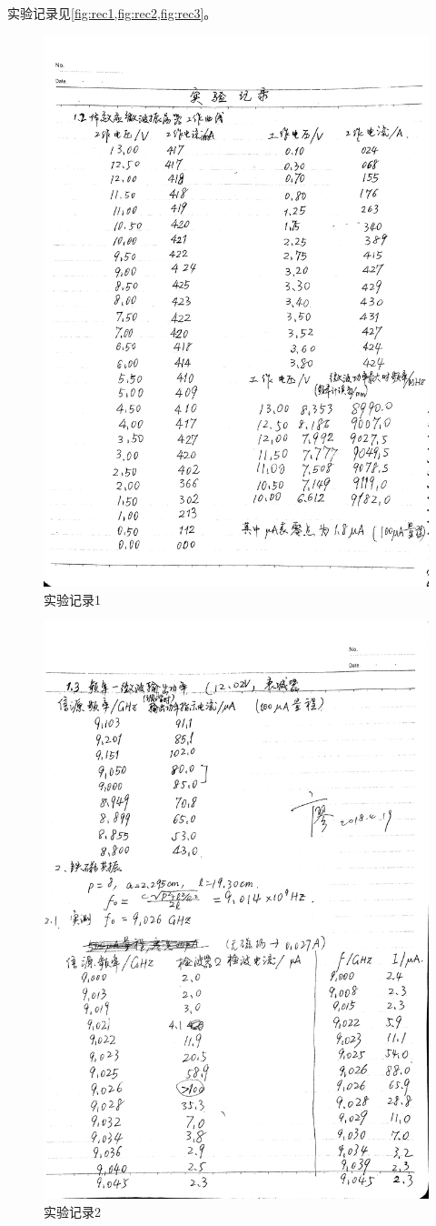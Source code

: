 实验记录见\cref{fig:rec1,fig:rec2,fig:rec3}。
\begin{figure}[htbp]
	\includegraphics[width=.8\textwidth]{fig/rec/mma/wave1.png}\caption{实验记录1}\label{fig:rec1}
\end{figure}
\begin{figure}[htbp]
	\includegraphics[width=.8\textwidth]{fig/rec/mma/wave2.png}\caption{实验记录2}\label{fig:rec2}
\end{figure}
